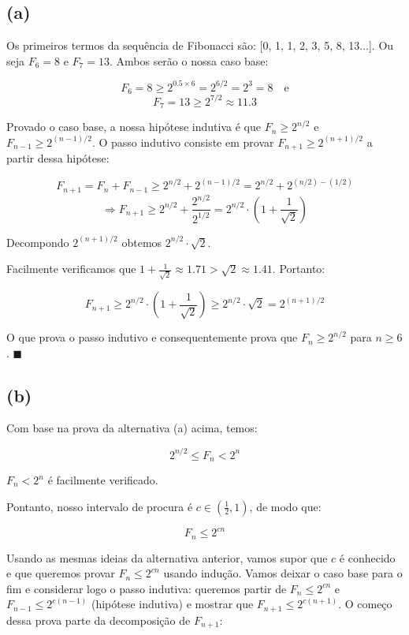 \documentclass[12pt, a4paper]{article}
\begin{document}
\subsection*{(a)}

Os primeiros termos da sequência de Fibonacci são: [0, 1, 1, 2, 3, 5, 8, 13...]. Ou seja $F_6 = 8$ e $F_7 = 13$. Ambos serão o nossa caso base:

\[ F_6 = 8 \geq 2^{0.5\times6} = 2^{6/2} = 2^3 = 8 \quad \textrm{e} \]
\[ F_7 = 13 \geq 2^{7/2} \approx 11.3 \]

Provado o caso base, a nossa hipótese indutiva é que $F_n \geq 2^{n/2}$ e $F_{n-1} \geq 2^{(n-1)/2}$. O passo indutivo consiste em provar $F_{n+1} \geq 2^{(n+1)/2}$ a partir dessa hipótese:

\[ F_{n+1} = F_n + F_{n-1} \geq 2^{n/2} + 2^{(n-1)/2} = 2^{n/2} + 2^{(n/2) - (1/2)} \]
\[ \Rightarrow F_{n+1} \geq 2^{n/2} + \frac{2^{n/2}}{2^{1/2}} = 2^{n/2} \cdot \left( 1 + \frac{1}{\sqrt{2}} \right) \]

Decompondo $2^{(n+1)/2}$ obtemos $2^{n/2} \cdot \sqrt{2}$.

Facilmente verificamos que $1 + \frac{1}{\sqrt{2}} \approx 1.71 > \sqrt{2} \approx 1.41$. Portanto:

\[ F_{n+1} \geq  2^{n/2} \cdot \left( 1 + \frac{1}{\sqrt{2}} \right) \geq 2^{n/2} \cdot \sqrt{2} = 2^{(n+1)/2} \]

O que prova o passo indutivo e consequentemente prova que $F_n \geq 2^{n/2}$ para $n \geq 6$. $\blacksquare$

\subsection*{(b)}

Com base na prova da alternativa (a) acima, temos:

\[ 2^{n/2} \leq F_n < 2^n \]

$F_n < 2^n$ é facilmente verificado.

Pontanto, nosso intervalo de procura é $c \in (\frac{1}{2},1)$, de modo que:

\[ F_n \leq 2^{cn} \]

Usando as mesmas ideias da alternativa anterior, vamos supor que $c$ é conhecido e que queremos provar $F_n \leq 2^{cn}$ usando indução. Vamos deixar o caso base para o fim e considerar logo o passo indutiva: queremos partir de $F_n \leq 2^{cn}$ e $F_{n-1} \leq 2^{c(n-1)}$ (hipótese indutiva) e mostrar que $F_{n+1} \leq 2^{c(n+1)}$. O começo dessa prova parte da decomposição de $F_{n+1}$:
\end{document}
